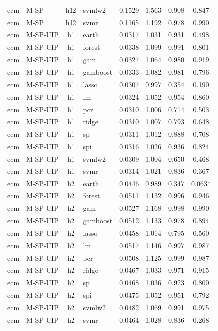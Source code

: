 \begin{ThreePartTable}
\begin{longtable}[t]{llclcccc}
ecm & M-SP & h12 & svmlw2 & 0.1529 & 1.563 & 0.908 & 0.847\\
ecm & M-SP & h12 & svmr & 0.1165 & 1.192 & 0.978 & 0.990\\
\addlinespace
ecm & M-SP-UIP & h1 & earth & 0.0317 & 1.031 & 0.931 & 0.498\\
ecm & M-SP-UIP & h1 & forest & 0.0338 & 1.099 & 0.991 & 0.801\\
ecm & M-SP-UIP & h1 & gam & 0.0327 & 1.064 & 0.980 & 0.919\\
ecm & M-SP-UIP & h1 & gamboost & 0.0333 & 1.082 & 0.981 & 0.796\\
ecm & M-SP-UIP & h1 & lasso & 0.0307 & 0.997 & 0.354 & 0.190\\
ecm & M-SP-UIP & h1 & lm & 0.0324 & 1.052 & 0.954 & 0.860\\
ecm & M-SP-UIP & h1 & pcr & 0.0310 & 1.006 & 0.714 & 0.503\\
ecm & M-SP-UIP & h1 & ridge & 0.0310 & 1.007 & 0.793 & 0.648\\
ecm & M-SP-UIP & h1 & sp & 0.0311 & 1.012 & 0.888 & 0.708\\
ecm & M-SP-UIP & h1 & spi & 0.0316 & 1.026 & 0.936 & 0.824\\
ecm & M-SP-UIP & h1 & svmlw2 & 0.0309 & 1.004 & 0.650 & 0.468\\
ecm & M-SP-UIP & h1 & svmr & 0.0314 & 1.021 & 0.836 & 0.367\\
\addlinespace
ecm & M-SP-UIP & h2 & earth & 0.0446 & 0.989 & 0.347 & 0.063*\\
ecm & M-SP-UIP & h2 & forest & 0.0511 & 1.132 & 0.996 & 0.946\\
ecm & M-SP-UIP & h2 & gam & 0.0527 & 1.168 & 0.998 & 0.990\\
ecm & M-SP-UIP & h2 & gamboost & 0.0512 & 1.133 & 0.978 & 0.894\\
ecm & M-SP-UIP & h2 & lasso & 0.0458 & 1.014 & 0.795 & 0.560\\
ecm & M-SP-UIP & h2 & lm & 0.0517 & 1.146 & 0.997 & 0.987\\
ecm & M-SP-UIP & h2 & pcr & 0.0508 & 1.125 & 0.999 & 0.987\\
ecm & M-SP-UIP & h2 & ridge & 0.0467 & 1.033 & 0.971 & 0.915\\
ecm & M-SP-UIP & h2 & sp & 0.0468 & 1.036 & 0.923 & 0.800\\
ecm & M-SP-UIP & h2 & spi & 0.0475 & 1.052 & 0.951 & 0.792\\
ecm & M-SP-UIP & h2 & svmlw2 & 0.0482 & 1.069 & 0.991 & 0.975\\
ecm & M-SP-UIP & h2 & svmr & 0.0464 & 1.028 & 0.836 & 0.268\\

\end{longtable}
\end{ThreePartTable}
